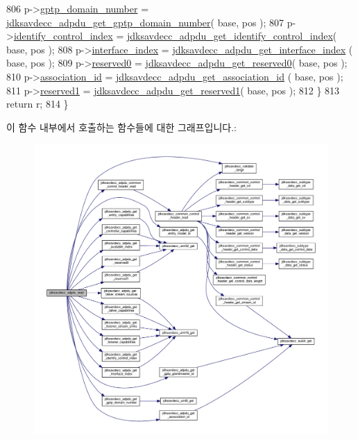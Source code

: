 \begin{DoxyCode}
806         p->\hyperlink{structjdksavdecc__adpdu_ac53b4e61c0f960e16c86cfe678ca256d}{gptp\_domain\_number} = 
      \hyperlink{group__adpdu_ga30d6895c799763e1db472ac028ff2866}{jdksavdecc\_adpdu\_get\_gptp\_domain\_number}( base, pos );
807         p->\hyperlink{structjdksavdecc__adpdu_a69d51a66f10075eb16f0f66089a66a41}{identify\_control\_index} = 
      \hyperlink{group__adpdu_gafb99f55db66cfcb0879860f0fe4b329f}{jdksavdecc\_adpdu\_get\_identify\_control\_index}( base, pos );
808         p->\hyperlink{structjdksavdecc__adpdu_a6854e0a91fc5bf42d2186aba65dd247d}{interface\_index} = \hyperlink{group__adpdu_gac8a8b6bfc95370b68dfd1f5bfd335ae2}{jdksavdecc\_adpdu\_get\_interface\_index}
      ( base, pos );
809         p->\hyperlink{structjdksavdecc__adpdu_aed93283265f941dc1d2bf8d634164493}{reserved0} = \hyperlink{group__adpdu_ga2031c88944f0ac9bb7acbef84317c67f}{jdksavdecc\_adpdu\_get\_reserved0}( base, pos );
810         p->\hyperlink{structjdksavdecc__adpdu_a0fa49c5118429af7a5ee7d71eada7b94}{association\_id} = \hyperlink{group__adpdu_ga033e6dd0b16beee436f9d8cb2c0bfd70}{jdksavdecc\_adpdu\_get\_association\_id}
      ( base, pos );
811         p->\hyperlink{structjdksavdecc__adpdu_aef9bb556c1530f5d648fd57e73b9a105}{reserved1} = \hyperlink{group__adpdu_ga855228a4d0b00d861cc77b79afa6f52b}{jdksavdecc\_adpdu\_get\_reserved1}( base, pos );
812     \}
813     \textcolor{keywordflow}{return} r;
814 \}
\end{DoxyCode}


이 함수 내부에서 호출하는 함수들에 대한 그래프입니다.\+:
\nopagebreak
\begin{figure}[H]
\begin{center}
\leavevmode
\includegraphics[width=350pt]{group__adpdu_ga0b7b4807db97c9d3deaeed3b8b11adc1_cgraph}
\end{center}
\end{figure}





